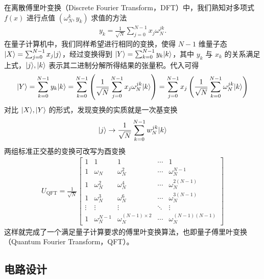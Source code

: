在离散傅里叶变换（Discrete Fourier Transform，DFT）中，我们熟知对多项式 $f(x)$ 进行点值 $(\omega_N^k,y_k)$ 求值的方法 \begin{align*}
    y_k=\frac{1}{\sqrt{N}}\sum_{j=0}^{N-1}x_j\omega_N^{jk}.
\end{align*}
在量子计算机中，我们同样希望进行相同的变换，使得 $N-1$ 维量子态 $|X\rangle=\sum_{j=0}^{N-1}x_j|j\rangle$，经过变换得到 $|Y\rangle=\sum_{k=0}^{N-1}y_k|k\rangle$，其中 $y_k$ 与 $x_k$ 的关系满足上式，$|j\rangle,|k\rangle$ 表示其二进制分解所得结果的张量积。代入可得 \begin{align*}
    |Y\rangle=\sum_{k=0}^{N-1}y_k|k\rangle=\sum_{k=0}^{N-1}\left(\frac{1}{\sqrt{N}}\sum_{j=0}^{N-1}x_j\omega_N^{jk}|k\rangle\right)=\sum_{j=0}^{N-1}x_j\left(\frac{1}{\sqrt{N}}\sum_{k=0}^{N-1}\omega_N^{jk}|k\rangle\right)
\end{align*}
对比 $|X\rangle,|Y\rangle$ 的形式，发现变换的实质就是一次基变换 \begin{align}\begin{aligned}
        |j\rangle\to\frac{1}{\sqrt{N}}\sum_{k=0}^{N-1}w_N^{jk}|k\rangle\label{eq:qft-change-basis}
    \end{aligned}\end{align}
两组标准正交基的变换可改写为酉变换 \begin{align*}
    U_{\text{QFT}} = \frac{1}{\sqrt{N}}
    \begin{bmatrix}
        1      & 1               & 1                         & \cdots & 1                      \\
        1      & \omega_N        & \omega_N ^{2}             & \cdots & \omega_N ^{N-1}        \\
        1      & \omega_N ^{2}   & \omega_N ^{4}             & \cdots & \omega_N ^{2(N-1)}     \\
        1      & \omega_N ^{3}   & \omega_N ^{6}             & \cdots & \omega_N ^{3(N-1)}     \\
        \vdots & \vdots          & \vdots                    & \ddots & \vdots                 \\
        1      & \omega_N ^{N-1} & \omega_N ^{(N-1)\times 2} & \cdots & \omega_N ^{(N-1)(N-1)}
    \end{bmatrix}
\end{align*}
这样就完成了一个满足量子计算要求的傅里叶变换算法，也即量子傅里叶变换（Quantum Fourier Transform，QFT）。

\subsection{电路设计}

